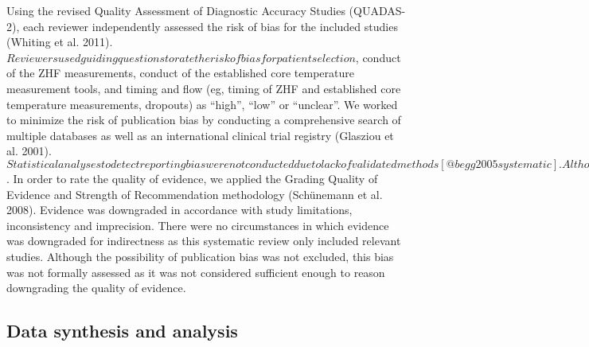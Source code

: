 \documentclass[smallextended]{svjour3}       %
\begin{document}
Using the revised Quality Assessment of Diagnostic Accuracy Studies
(QUADAS-2), each reviewer independently assessed the risk of bias for
the included studies (Whiting et al. 2011).
\(Reviewers used guiding questions to rate the risk of bias for patient selection\),
conduct of the ZHF measurements, conduct of the established core
temperature measurement tools, and timing and flow (eg, timing of ZHF
and established core temperature measurements, dropouts) as ``high'',
``low'' or ``unclear''. We worked to minimize the risk of publication
bias by conducting a comprehensive search of multiple databases as well
as an international clinical trial registry (Glasziou et al. 2001).
\(Statistical analyses to detect reporting bias were not conducted due to lack of validated methods [@begg2005systematic]. Although some meta-analyses of method comparison studies have used tests for detecting funnel plot asymmetry [@niven2015accuracy], simulations have revealed that such tests will result in publication bias being incorrectly identified too often [@deeks2005performance]\).
In order to rate the quality of evidence, we applied the Grading Quality
of Evidence and Strength of Recommendation methodology (Schünemann et
al. 2008). Evidence was downgraded in accordance with study limitations,
inconsistency and imprecision. There were no circumstances in which
evidence was downgraded for indirectness as this systematic review only
included relevant studies. Although the possibility of publication bias
was not excluded, this bias was not formally assessed as it was not
considered sufficient enough to reason downgrading the quality of
evidence.

\hypertarget{data-synthesis-and-analysis}{%
\subsection{Data synthesis and
analysis}\label{data-synthesis-and-analysis}}
\end{document}
